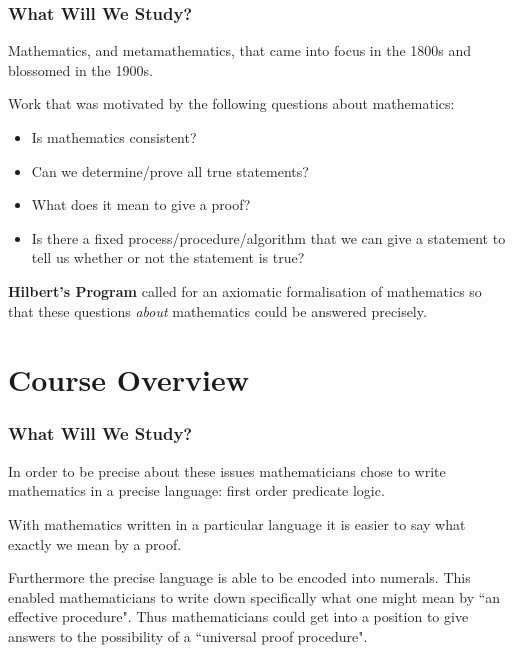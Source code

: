 \documentclass{beamer}
\theoremstyle{indentDefn} \newtheorem{defn}[]{Definition}
\begin{document}
\begin{frame}
	\frametitle{What Will We Study?}
	
	Mathematics, and metamathematics, that came into focus in the 1800s and blossomed in the 1900s. 
	
	\vspace{0.2cm}
	
	Work that was motivated by the following questions about mathematics: 
	
	\begin{itemize}
		\item Is mathematics consistent?
		\item Can we determine/prove all true statements?
		\item What does it mean to give a proof?
		\item Is there a fixed process/procedure/algorithm that we can give a statement to tell us whether or not the statement is true?
	\end{itemize}
	
	{\bf Hilbert's Program} called for an axiomatic formalisation of mathematics so that these questions \textit{about} mathematics could be answered precisely. 
	
\end{frame}

\section{Course Overview}

\begin{frame}
	\frametitle{What Will We Study?}
	
	In order to be precise about these issues mathematicians chose to write mathematics in a precise language: first order predicate logic. 
	
	\vspace{0.2cm}
	
	With mathematics written in a particular language it is easier to say what exactly we mean by a proof. 
	
	\vspace{0.2cm} 
	
	Furthermore the precise language is able to be encoded into numerals. This enabled mathematicians to write down specifically what one might mean by ``an effective procedure". Thus mathematicians could get into a position to give answers to the possibility of a ``universal proof procedure".
	
\end{frame}
\end{document}
